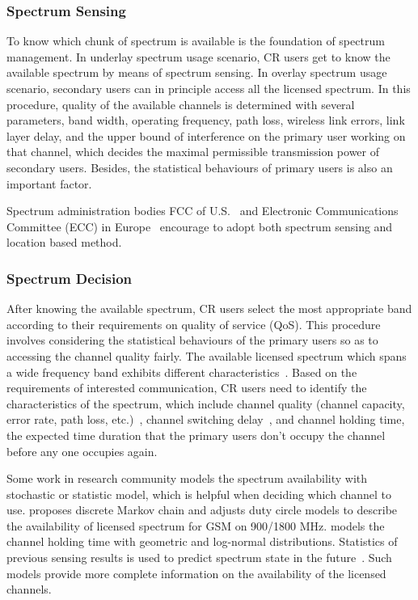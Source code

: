\subsubsection*{Spectrum Sensing}
To know which chunk of spectrum is available is the foundation of spectrum management.
In underlay spectrum usage scenario, CR users get to know the available spectrum by means of spectrum sensing.
In overlay spectrum usage scenario, secondary users can in principle access all the licensed spectrum.
In this procedure, quality of the available channels is determined with several parameters, \ie band width, operating frequency, path loss, wireless link errors, link layer delay, and the upper bound of interference on the primary user working on that channel, which decides the maximal permissible transmission power of secondary users.
Besides, the statistical behaviours of primary users is also an important factor.

Spectrum administration bodies FCC of U.S.~\cite{FCC_2010_sedond_memorandumm} and Electronic Communications Committee (\gls{ECC}) in Europe~\cite{ecc159} encourage to adopt both spectrum sensing and location based method.

\subsubsection*{Spectrum Decision}
After knowing the available spectrum, CR users select the most appropriate band according to their requirements on quality of service (QoS).
This procedure involves considering the statistical behaviours of the primary users so as to accessing the channel quality fairly.
The available licensed spectrum which spans a wide frequency band exhibits different characteristics~\cite{spectrum_decision_TMC11}.
Based on the requirements of interested communication, CR users need to identify the characteristics of the spectrum, which include channel quality (channel capacity, error rate, path loss, etc.)~\cite{spectrum_decision_TMC11}, channel switching delay~\cite{channel_switch_delay11}, and channel holding time, \ie the expected time duration that the primary users don't occupy the channel before any one occupies again.

Some work in research community models the spectrum availability with stochastic or statistic model, which is helpful when deciding which channel to use.
\cite{Discrete-Time_Spectrum_Occupancy_Model_DySPAN_2011} proposes discrete Markov chain and adjusts duty circle models to describe the availability of licensed spectrum for GSM on 900/1800 MHz.
\cite{Wellens200910} models the channel holding time with geometric and log-normal distributions.
Statistics of previous sensing results is used to predict spectrum state in the future~\cite{spectrum-discovery-tmc08}.
Such models provide more complete information on the availability of the licensed channels.




